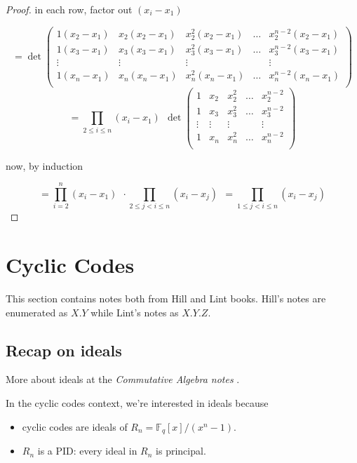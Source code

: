 \documentclass{article}
\theoremstyle{definition}
\begin{document}
\begin{proof}
in each row, factor out $(x_i - x_1)$

$$
= \det
\begin{pmatrix}
    1(x_2-x_1) & x_2(x_2 - x_1) & x_2^2(x_2 - x_1) & \ldots & x_2^{n-2}(x_2 - x_1) \\
    1(x_3-x_1) & x_3(x_3 - x_1) & x_3^2(x_3 - x_1) & \ldots & x_3^{n-2}(x_3 - x_1) \\
    \vdots & \vdots & \vdots &  & \vdots\\
    1(x_n-x_1) & x_n(x_n - x_1) & x_n^2(x_n - x_1) & \ldots & x_n^{n-2}(x_n - x_1) \\
\end{pmatrix}
$$
$$
= \prod_{2 \leq i \leq n} (x_i - x_1) ~~\det
\begin{pmatrix}
    1 & x_2 & x_2^2 & \ldots & x_2^{n-2} \\
    1 & x_3 & x_3^2 & \ldots & x_3^{n-2} \\
    \vdots & \vdots & \vdots &  & \vdots\\
    1 & x_n & x_n^2 & \ldots & x_n^{n-2} \\
\end{pmatrix}
$$

now, by induction

$$
= \prod_{i=2}^n (x_i - x_1) ~~\cdot \prod_{2 \leq j < i \leq n} (x_i - x_j) ~~= \prod_{1 \leq j < i \leq n} (x_i - x_j)
$$
\end{proof}


\vspace{1.0cm}

\section{Cyclic Codes}
This section contains notes both from Hill \cite{hill} and Lint \cite{lint} books. Hill's notes are enumerated as $X.Y$ while Lint's notes as $X.Y.Z$.

\subsection{Recap on ideals}
More about ideals at the \emph{Commutative Algebra notes} \cite{commutativealgebranotes}.
\vspace{0.6cm}

In the cyclic codes context, we're interested in ideals because
\begin{itemize}
  \item cyclic codes are ideals of $R_n = \mathbb{F}_q[x]/(x^n-1)$.
  \item $R_n$ is a PID: every ideal in $R_n$ is principal.
\end{itemize}
\end{document}
